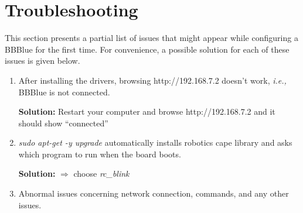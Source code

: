 \section{Troubleshooting}
\label{sec:troubleshooting}
This section presents a partial list of issues that might appear while configuring a BBBlue for the first time. For convenience, a possible solution for each of these issues is given below.  
\begin{enumerate}[\emph{T\#}1:]
  

  
  
    
\item After installing the drivers, browsing http://192.168.7.2 doesn't work, \textit{i.e.,} BBBlue is not connected. \label{trst:problem2}
   
    \textbf{Solution:} Restart your computer and browse http://192.168.7.2 and it should show ``connected''


    
\item \emph{sudo apt-get -y upgrade}  automatically installs robotics cape library and asks which program to run when the board boots. \label{trst:problem4}

    \textbf{Solution:}  $\Rightarrow$ choose \emph{rc\_blink}
    
\item Abnormal issues concerning network connection, commands, and any other issues. \label{trst:problem1}
    

\end{enumerate}
